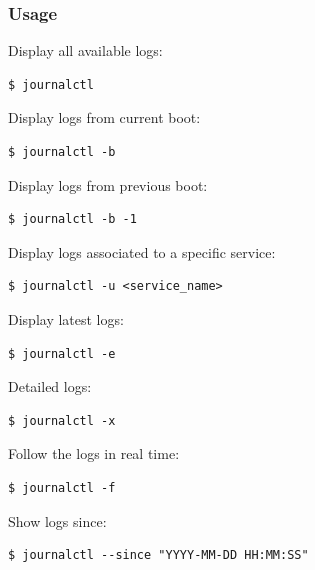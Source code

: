 \documentclass{article}
\newenvironment{codetemplate}[1][]{%
  \mybasecolorbox[#1]
  \itshape
}{%
  \endmybasecolorbox
}
\begin{document}
\subsubsection{Usage}

Display all available logs:
\begin{codetemplate}{}
\begin{verbatim}
$ journalctl
\end{verbatim}
\end{codetemplate}

Display logs from current boot:
\begin{codetemplate}{}
\begin{verbatim}
$ journalctl -b 
\end{verbatim}
\end{codetemplate}

Display logs from previous boot:
\begin{codetemplate}{}
\begin{verbatim}
$ journalctl -b -1
\end{verbatim}
\end{codetemplate}

Display logs associated to a specific service:
\begin{codetemplate}{}
\begin{verbatim}
$ journalctl -u <service_name>
\end{verbatim}
\end{codetemplate}

Display latest logs:
\begin{codetemplate}{}
\begin{verbatim}
$ journalctl -e
\end{verbatim}
\end{codetemplate}

Detailed logs:
\begin{codetemplate}{}
\begin{verbatim}
$ journalctl -x
\end{verbatim}
\end{codetemplate}

Follow the logs in real time:
\begin{codetemplate}{}
\begin{verbatim}
$ journalctl -f
\end{verbatim}
\end{codetemplate}

Show logs since:
\begin{codetemplate}{}
\begin{verbatim}
$ journalctl --since "YYYY-MM-DD HH:MM:SS"
\end{verbatim}
\end{codetemplate}
\end{document}
